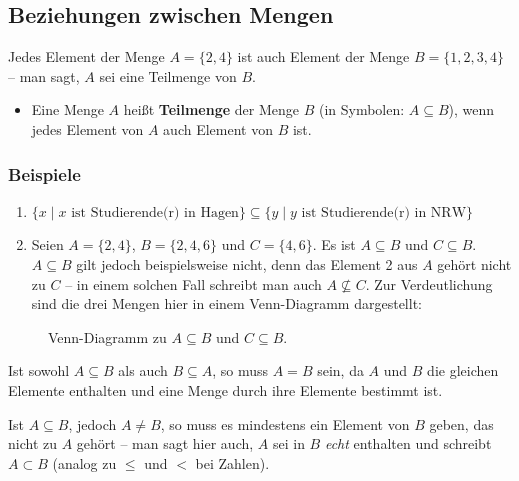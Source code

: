\subsection{Beziehungen zwischen Mengen}

Jedes Element der Menge $A=\{2,4\}$ ist auch Element der Menge $B=\{1,2,3,4\}$ -- man sagt, $A$ sei eine Teilmenge von $B$.

\begin{itemize}
  \item Eine Menge $A$ heißt \textbf{Teilmenge} der Menge $B$ (in Symbolen: $A \subseteq B$), wenn jedes Element von $A$ auch Element von $B$ ist.
\end{itemize}

\subsubsection{Beispiele}

\begin{enumerate}[label=\alph*)]
  \item $\{x \mid x \text{ ist Studierende(r) in Hagen}\} \subseteq \{y \mid y \text{ ist Studierende(r) in NRW}\}$\beispielende
  \item Seien $A=\{2,4\}$, $B=\{2,4,6\}$ und $C=\{4,6\}$. Es ist $A\subseteq B$ und $C\subseteq B$. $A\subseteq B$ gilt jedoch beispielsweise nicht, denn das Element 2 aus $A$ gehört nicht zu $C$ -- in einem solchen Fall schreibt man auch $A \not\subseteq C$. Zur Verdeutlichung sind die drei Mengen hier in einem Venn-Diagramm dargestellt:
\end{enumerate}

\begin{figure}[h]
  \centering
  \caption*{Venn-Diagramm zu $A \subseteq B$ und $C \subseteq B$.}
\end{figure}

Ist sowohl $A\subseteq B$ als auch $B\subseteq A$, so muss $A=B$ sein, da $A$ und $B$ die gleichen Elemente enthalten und eine Menge durch ihre Elemente bestimmt ist.

Ist $A\subseteq B$, jedoch $A\neq B$, so muss es mindestens ein Element von $B$ geben, das nicht zu $A$ gehört -- man sagt hier auch, $A$ sei in $B$ \emph{echt} enthalten und schreibt $A\subset B$ (analog zu $\leq$ und $<$ bei Zahlen).

